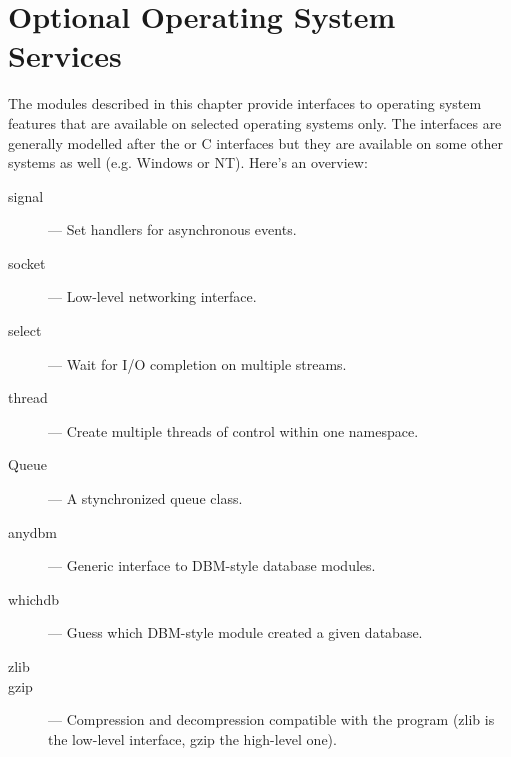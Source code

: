 \chapter{Optional Operating System Services}

The modules described in this chapter provide interfaces to operating
system features that are available on selected operating systems only.
The interfaces are generally modelled after the \UNIX{} or C
interfaces but they are available on some other systems as well
(e.g. Windows or NT).  Here's an overview:

\begin{description}

\item[signal]
--- Set handlers for asynchronous events.

\item[socket]
--- Low-level networking interface.

\item[select]
--- Wait for I/O completion on multiple streams.

\item[thread]
--- Create multiple threads of control within one namespace.

\item[Queue]
--- A stynchronized queue class.

\item[anydbm]
--- Generic interface to DBM-style database modules.

\item[whichdb]
--- Guess which DBM-style module created a given database.

\item[zlib]
\item[gzip]
--- Compression and decompression compatible with the
 program (zlib is the low-level interface, gzip the
high-level one).

\end{description}
